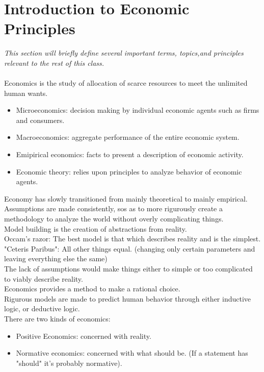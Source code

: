 \documentclass[nobib]{tufte-handout}
\begin{document}
\section{Introduction to Economic Principles}
\textit{This section will briefly define several important terms, topics,and principles relevant to the rest of this class.}\\~\\
Economics is the study of allocation of scarce resources to meet the unlimited
human wants.
\begin{itemize}
    \item Microeconomics: decision making by individual economic agents such as firms and
          consumers.
    \item Macroeconomics: aggregate performance of the entire economic system.
    \item Emipirical economics: facts to present a description of economic activity.
    \item Economic theory: relies upon principles to analyze behavior of economic agents.
\end{itemize}
Economy has slowly transitioned from mainly theoretical to mainly empirical.\\
Assumptions are made consistently, sos as to more rigurously create a methodology to analyze the world without overly complicating things.\\
Model building is the creation of abstractions from reality.\\
\quad Occam's razor: The best model is that which describes reality and is the simplest.\\
\quad "Ceteris Paribus": All other things equal. (changing only certain parameters and leaving everything else the same)\\
\quad The lack of assumptions would make things either to simple or too complicated to viably describe reality.\\
\quad Economics provides a method to make a rational choice.\\
\quad Rigurous models are made to predict human behavior through either inductive logic, or deductive logic.\\
There are two kinds of economics:
\begin{itemize}
    \item Positive Economics: concerned with reality.
    \item Normative economics: concerned with what should be. (If a statement has
          "should" it's probably normative).
\end{itemize}
\end{document}
